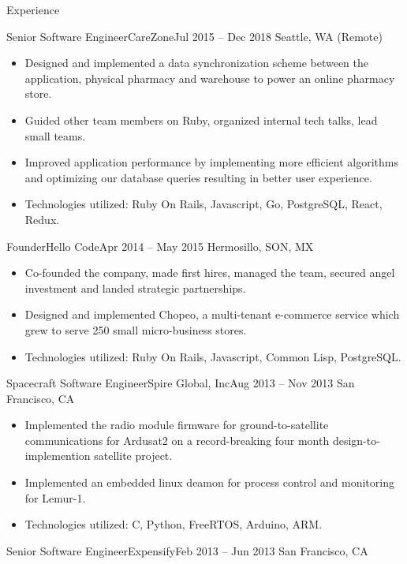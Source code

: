 \documentclass[calibri]{mcdowellcv}
\begin{document}
\begin{cvsection}{Experience}
\begin{cvsubsection}{Senior Software Engineer}{CareZone}{Jul 2015 -- Dec 2018}
		Seattle, WA (Remote)
		\begin{itemize}%
			\item Designed and implemented a data synchronization scheme between the application, physical pharmacy and warehouse to power an online pharmacy store.
			\item Guided other team members on Ruby, organized internal tech talks, lead small teams.
			\item Improved application performance by implementing more efficient algorithms and optimizing our database queries resulting in better user experience.
			\item Technologies utilized: Ruby On Rails, Javascript, Go, PostgreSQL, React, Redux.
		\end{itemize}
	\end{cvsubsection}
	\vskip 0.3in
	\begin{cvsubsection}{Founder}{Hello Code}{Apr 2014 -- May 2015}
		Hermosillo, SON, MX
		\begin{itemize}%
			\item Co-founded the company, made first hires, managed the team, secured angel investment and landed strategic partnerships.
			\item Designed and implemented Chopeo, a multi-tenant e-commerce service which grew to serve 250 small micro-business stores.
			\item Technologies utilized: Ruby On Rails, Javascript, Common Lisp, PostgreSQL.
		\end{itemize}
	\end{cvsubsection}
	\vskip 0.3in
	\begin{cvsubsection}{Spacecraft Software Engineer}{Spire Global, Inc}{Aug 2013 -- Nov 2013}
		San Francisco, CA
		\begin{itemize}%
			\item Implemented the radio module firmware for ground-to-satellite communications for Ardusat2 on a record-breaking four month design-to-implemention satellite project.
			\item Implemented an embedded linux deamon for process control and monitoring for Lemur-1.
			\item Technologies utilized: C, Python, FreeRTOS, Arduino, ARM.
		\end{itemize}
	\end{cvsubsection}
	\vskip 0.3in
	\begin{cvsubsection}{Senior Software Engineer}{Expensify}{Feb 2013 -- Jun 2013}
		San Francisco, CA
		\begin{itemize}%

\end{itemize}
\end{cvsubsection}
\end{cvsection}
\end{document}
